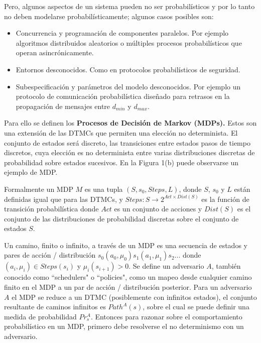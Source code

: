 \documentclass[11pt]{article}
\begin{document}
Pero, algunos aspectos de un sistema pueden no ser probabil\'isticos y por lo tanto no deben modelarse probabil\'isticamente; algunos casos posibles son:

\begin{itemize}
	\item Concurrencia y programaci\'on de componentes paralelos. Por ejemplo algoritmos distribuidos aleatorios o m\'ultiples procesos probabil\'isticos que operan asincr\'onicamente.
	
	\item Entornos desconocidos. Como en protocolos probabil\'isticos de seguridad. %
	
	\item Subespecificaci\'on y par\'ametros del modelo desconocidos. Por ejemplo un protocolo de comunicaci\'on probabil\'istica dise\~nado para retrasos en la propagaci\'on de mensajes entre $d_{min}$ y $d_{max}$.
	
\end{itemize}

Para ello se definen los \textbf{Procesos de Decisi\'on de Markov (MDPs).} Estos son una extensi\'on de las DTMCs que permiten una elecci\'on no determinista. El conjunto de estados ser\'a discreto, las transiciones entre estados pasos de tiempo discretos, cuya elecci\'on es no determinista entre varias distribuciones discretas de probabilidad sobre estados sucesivos. En la Figura 1(b) puede observarse un ejemplo de MDP.

Formalmente un MDP $M$ es una tupla $(S, s_0, Steps, L)$, donde $S$, $s_0$ y $L$ est\'an definidas igual que para las DTMCs, y $Steps: S \rightarrow 2^{Act \times  Dist(S)}$ es la funci\'on de transici\'on probabil\'istica donde $Act$ es un conjunto de acciones y $Dist(S)$ es el conjunto de las distribuciones de probabilidad discretas sobre el conjunto de estados $S$.

Un camino, finito o infinito, a trav\'es de un MDP es una secuencia de estados y pares de acci\'on / distribuci\'on $s_0(a_0, \mu_0)s_1 (a_1, \mu_1)s_2...$ donde $(a_i, \mu_i) \in Steps(s_i)$ y $\mu_i(s_{i+1})>0$. %
Se define un adversario $A$, tambi\'en conocido como ``schedulers" o ``policies", como un mapeo desde cualquier camino finito en el MDP a un par de acci\'on / distribuci\'on posterior. Para un adversario $A$ el MDP se reduce a un DTMC (posiblemente con infinitos estados), el conjunto resultante de caminos infinitos es $Path^A(s)$, sobre el cual se puede definir una medida de probabilidad $Pr^A_s$. Entonces para razonar sobre el comportamiento probabil\'istico en un MDP, primero debe resolverse el no determinismo con un adversario. \\
\end{document}
